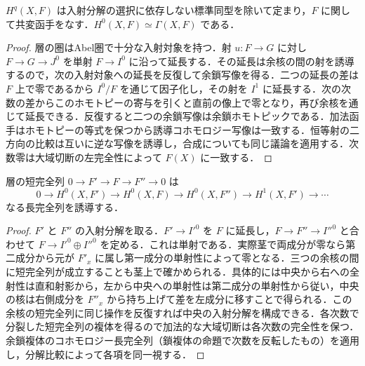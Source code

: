 \begin{prop}[分解独立性と函手性]
$H^q(X,F)$ は入射分解の選択に依存しない標準同型を除いて定まり，$F$ に関して共変函手をなす．$H^0(X,F)\simeq\Gamma(X,F)$ である．
\end{prop}
\begin{proof}
層の圏はAbel圏で十分な入射対象を持つ．射 $u:F\to G$ に対し $F\to G\to J^0$ を単射 $F\to I^0$ に沿って延長する．その延長は余核の間の射を誘導するので，次の入射対象への延長を反復して余鎖写像を得る．二つの延長の差は $F$ 上で零であるから $I^0/F$ を通じて因子化し，その射を $I^1$ に延長する．次の次数の差からこのホモトピーの寄与を引くと直前の像上で零となり，再び余核を通じて延長できる．反復すると二つの余鎖写像は余鎖ホモトピックである．加法函手はホモトピーの等式を保つから誘導コホモロジー写像は一致する．恒等射の二方向の比較は互いに逆な写像を誘導し，合成についても同じ議論を適用する．次数零は大域切断の左完全性によって $F(X)$ に一致する．
\end{proof}
\begin{prop}[層係数コホモロジーの長完全列]
層の短完全列 $0\to F'\to F\to F''\to0$ は
\[
0\to H^0(X,F')\to H^0(X,F)\to H^0(X,F'')
\to H^1(X,F')\to\cdots
\]
なる長完全列を誘導する．
\end{prop}
\begin{proof}
$F'$ と $F''$ の入射分解を取る．$F'\to I'^0$ を $F$ に延長し，$F\to F''\to I''^0$ と合わせて $F\to I'^0\oplus I''^0$ を定める．これは単射である．実際茎で両成分が零なら第二成分から元が $F'_x$ に属し第一成分の単射性によって零となる．三つの余核の間に短完全列が成立することも茎上で確かめられる．具体的には中央から右への全射性は直和射影から，左から中央への単射性は第二成分の単射性から従い，中央の核は右側成分を $F''_x$ から持ち上げて差を左成分に移すことで得られる．この余核の短完全列に同じ操作を反復すれば中央の入射分解を構成できる．各次数で分裂した短完全列の複体を得るので加法的な大域切断は各次数の完全性を保つ．余鎖複体のコホモロジー長完全列（鎖複体の命題で次数を反転したもの）を適用し，分解比較によって各項を同一視する．
\end{proof}
